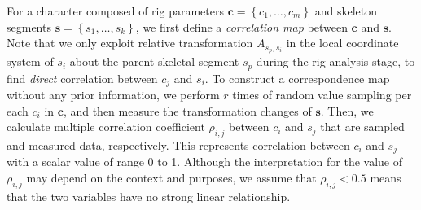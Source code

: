 For a character composed of rig parameters $\mathbf{c}=\left\{ c_1, \dots, c_m \right\}$ and skeleton segments $\mathbf{s}=\left\{ s_1, \dots, s_k \right\}$,
we first define a \textit{correlation map} between $\mathbf{c}$ and $\mathbf{s}$.
Note that we only exploit relative transformation $A_{s_p,s_i}$ in the local coordinate system of $s_i$ about the parent skeletal segment $s_p$ during the rig analysis stage, to find \textit{direct} correlation between $c_j$ and $s_i$.
To construct a correspondence map without any prior information, we perform $r$ times of random value sampling per each $c_i$ in $\mathbf{c}$, and then measure the transformation changes of $\mathbf{s}$.
Then, we calculate multiple correlation coefficient $\rho_{i,j}$ between $c_i$ and $s_j$ that are sampled and measured data, respectively.
This represents correlation between $c_{i}$ and $s_{j}$  with a scalar value of range 0 to 1. Although the interpretation for the value of $\rho_{i,j}$ may depend on the context and purposes, we assume that $\rho_{i,j} < 0.5$ means that the two variables have no strong linear relationship\cite{mark2001practical}.

